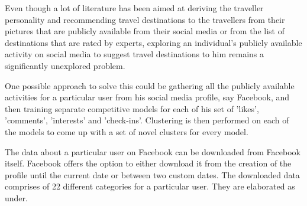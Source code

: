 Even though a lot of literature has been aimed at deriving the traveller personality and recommending travel destinations to the travellers from their pictures that are publicly available from their social media or from the list of destinations that are rated by experts, exploring an individual's publicly available activity on social media to suggest travel destinations to him remains a significantly unexplored problem.

One possible approach to solve this could be gathering all the publicly available activities for a particular user from his social media profile, say Facebook, and then training separate competitive models for each of his set of 'likes', 'comments', 'interests' and 'check-ins'. Clustering is then performed on each of the models to come up with a set of novel clusters for every model. 

The data about a particular user on Facebook can be downloaded from Facebook itself. Facebook offers the option to either download it from the creation of the profile until the current date or between two custom dates.
The downloaded data comprises of 22 different categories for a particular user. They are elaborated as under. 

